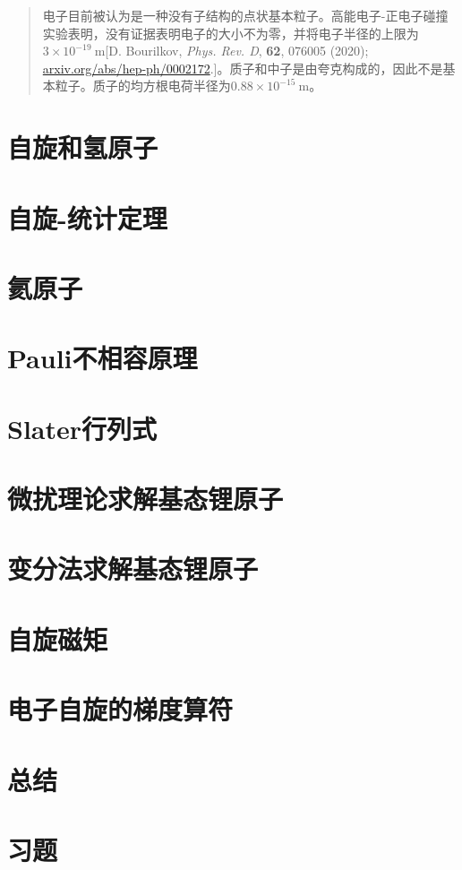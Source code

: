     \begin{quote}
        \small
        \noindent
        电子目前被认为是一种没有子结构的点状基本粒子。高能电子-正电子碰撞实验表明，没有证据表明电子的大小不为零，并将电子半径的上限为$3 \times 10^{-19} \:\mathrm{m}$[D. Bourilkov, \textit{Phys. Rev. D}, \textbf{62}, 076005 (2020); \url{arxiv.org/abs/hep-ph/0002172}.]。质子和中子是由夸克构成的，因此不是基本粒子。质子的均方根电荷半径为$0.88 \times 10^{-15} \:\mathrm{m}$。
    \end{quote}

\section{自旋和氢原子}
\label{sec:10.2 Spin and the Hydrogen Atom}












\section{自旋-统计定理}
\label{sec:10.3 Spin-Statistics Theorem}

\section{氦原子}
\label{sec:10.4 Th Helium Atom}

\section{Pauli不相容原理}
\label{sec:10.5 The Pauli Exclusion Principle}

\section{Slater行列式}
\label{sec:10.6 Slater Determinants}

\section{微扰理论求解基态锂原子}
\label{sec:10.7 Perturbation Treatment of the Lithium Ground State}

\section{变分法求解基态锂原子}
\label{sec:10.8 Variation Treatments of the Lithium Ground State}

\section{自旋磁矩}
\label{sec:10.9 Spin Magnetic Moment}

\section{电子自旋的梯度算符}
\label{sec:10.10 Ladder Operators for Electron Spin}

\section*{总结}

\section*{习题}